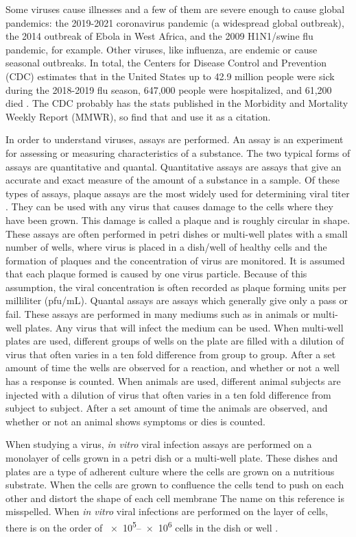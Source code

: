 Some viruses cause illnesses and a few of them are severe enough to cause global pandemics: the 2019-2021 coronavirus pandemic (a widespread global outbreak), the 2014 outbreak of Ebola in West Africa, and the 2009 H1N1/swine flu pandemic, for example. Other viruses, like influenza, are endemic or cause seasonal outbreaks. In total, the Centers for Disease Control and Prevention (CDC) estimates that in the United States up to 42.9 million people were sick during the 2018-2019 flu season, 647,000 people were hospitalized, and 61,200 died \citep{website4}. \color{red} The CDC probably has the stats published in the Morbidity and Mortality Weekly Report (MMWR), so find that and use it as a citation. \color{black}

In order to understand viruses, assays are performed. An assay is an experiment for assessing or measuring characteristics of a substance. The two typical forms of assays are quantitative and quantal. Quantitative assays are assays that give an accurate and exact measure of the amount of a substance in a sample. Of these types of assays, plaque assays are the most widely used for determining viral titer \citep{Kumar}. They can be used with any virus that causes damage to the cells where they have been grown. This damage is called a plaque and is roughly circular in shape. These assays are often performed in petri dishes or multi-well plates with a small number of wells, where virus is placed in a dish/well of healthy cells and the formation of plaques and the concentration of virus are monitored. It is assumed that each plaque formed is caused by one virus particle. Because of this assumption, the viral concentration is often recorded as plaque forming units per milliliter (pfu/mL). Quantal assays are assays which generally give only a pass or fail. These assays are performed in many mediums such as in animals or multi-well plates. Any virus that will infect the medium can be used. When multi-well plates are used, different groups of wells on the plate are filled with a dilution of virus that often varies in a ten fold difference from group to group. After a set amount of time the wells are observed for a reaction, and whether or not a well has a response is counted. When animals are used, different animal subjects are injected with a dilution of virus that often varies in a ten fold difference from subject to subject. After a set amount of time the animals are observed, and whether or not an animal shows symptoms or dies is counted.


When studying a virus, \emph{in vitro} viral infection assays are performed on a monolayer of cells grown in a petri dish or a multi-well plate. These dishes and plates are a type of adherent culture where the cells are grown on a nutritious substrate. When the cells are grown to confluence the cells tend to push on each other and distort the shape of each cell membrane \citep{bruckner_importance_2018} \color{red}The name on this reference is misspelled\color{black}. When \emph{in vitro} viral infections are performed on the layer of cells, there is on the order of \numrange[range-phrase = --]{e5}{e6} cells in the dish or well \citep{Number_of_cells_in_a_dish_noauthor_useful_nodate}. 

